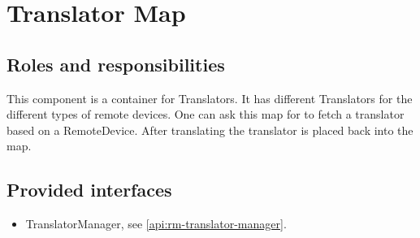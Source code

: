 \section{Translator Map}
\label{element:rm-translator-map}

\subsection{Roles and responsibilities}

\npar This component is a container for Translators. It has different
Translators for the different types of remote devices. One can ask this map for
to fetch a translator based on a RemoteDevice. After translating the translator
is placed back into the map.

\subsection{Provided interfaces}

\begin{itemize}
  \item TranslatorManager, see \ref{api:rm-translator-manager}.
\end{itemize}
